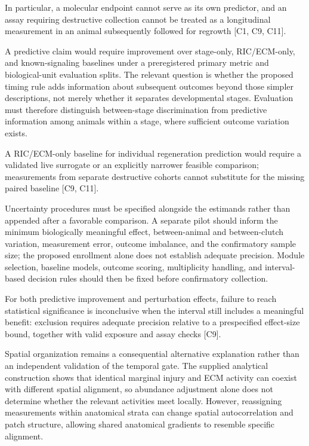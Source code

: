 \documentclass[11pt]{article}
\begin{document}
In particular, a molecular endpoint cannot serve as its own predictor, and an assay requiring destructive collection cannot be treated as a longitudinal measurement in an animal subsequently followed for regrowth [C1, C9, C11].

A predictive claim would require improvement over stage-only, RIC/ECM-only, and known-signaling baselines under a preregistered primary metric and biological-unit evaluation splits. The relevant question is whether the proposed timing rule adds information about subsequent outcomes beyond those simpler descriptions, not merely whether it separates developmental stages. Evaluation must therefore distinguish between-stage discrimination from predictive information among animals within a stage, where sufficient outcome variation exists.

A RIC/ECM-only baseline for individual regeneration prediction would require a validated live surrogate or an explicitly narrower feasible comparison; measurements from separate destructive cohorts cannot substitute for the missing paired baseline [C9, C11].

Uncertainty procedures must be specified alongside the estimands rather than appended after a favorable comparison. A separate pilot should inform the minimum biologically meaningful effect, between-animal and between-clutch variation, measurement error, outcome imbalance, and the confirmatory sample size; the proposed enrollment alone does not establish adequate precision. Module selection, baseline models, outcome scoring, multiplicity handling, and interval-based decision rules should then be fixed before confirmatory collection.

For both predictive improvement and perturbation effects, failure to reach statistical significance is inconclusive when the interval still includes a meaningful benefit: exclusion requires adequate precision relative to a prespecified effect-size bound, together with valid exposure and assay checks [C9].

Spatial organization remains a consequential alternative explanation rather than an independent validation of the temporal gate. The supplied analytical construction shows that identical marginal injury and ECM activity can coexist with different spatial alignment, so abundance adjustment alone does not determine whether the relevant activities meet locally. However, reassigning measurements within anatomical strata can change spatial autocorrelation and patch structure, allowing shared anatomical gradients to resemble specific alignment.
\end{document}
